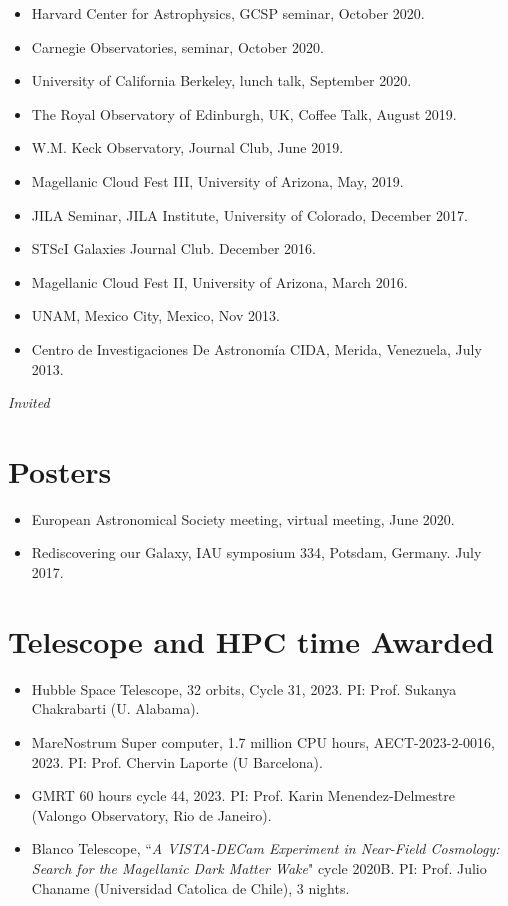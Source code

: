 \documentclass[UTF8]{article}
\begin{document}
\begin{itemize}
\item Harvard Center for Astrophysics, GCSP seminar, October 2020.
\item Carnegie Observatories, seminar, October 2020. \dag
\item University of California Berkeley, lunch talk, September 2020. 
\item The Royal Observatory of Edinburgh, UK, Coffee Talk, August 2019. \dag
\item W.M. Keck Observatory, Journal Club, June 2019.
\item Magellanic Cloud Fest III, University of Arizona, May, 2019.
\item JILA Seminar, JILA Institute, University of Colorado, December 2017.
\item STScI Galaxies Journal Club. December 2016.
\item Magellanic Cloud Fest II, University of Arizona, March 2016.
\item UNAM, Mexico City, Mexico, Nov 2013. 
\item Centro de Investigaciones De Astronom\'ia CIDA, Merida, Venezuela, July 2013.
\end{itemize}
\indent \dag \textit{Invited}

\section*{Posters}
\begin{itemize}
\setlength\itemsep{0.0em}
\renewcommand\labelitemi{$\cdot$}
  \item European Astronomical Society meeting, virtual meeting, June 2020.
  \item Rediscovering our Galaxy, IAU symposium 334, Potsdam, Germany. July 2017.
\end{itemize}

\section*{Telescope and HPC time Awarded}
\begin{itemize}
  \setlength\itemsep{0.0em}
  \renewcommand\labelitemi{$\cdot$}
\item Hubble Space Telescope, 32 orbits, Cycle 31, 2023. PI: Prof. Sukanya Chakrabarti (U. Alabama). 
\item MareNostrum Super computer, 1.7 million CPU hours, AECT-2023-2-0016, 2023.
  PI: Prof. Chervin Laporte (U Barcelona). 
\item GMRT 60 hours cycle 44, 2023. PI: Prof. Karin Menendez-Delmestre (Valongo Observatory, Rio de Janeiro).
\item Blanco Telescope, ``\textit{A VISTA-DECam Experiment in Near-Field
  Cosmology: Search for the Magellanic Dark Matter Wake}" cycle 2020B. PI: Prof. Julio
  Chaname (Universidad Catolica de Chile), 3 nights.
\end{itemize}
\end{document}
